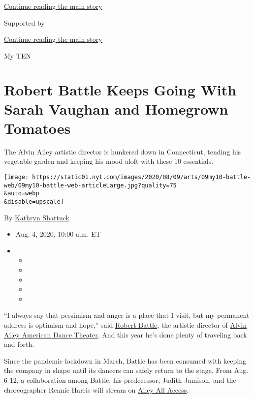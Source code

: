 \protect\hyperlink{after-top}{Continue reading the main story}

Supported by

\protect\hyperlink{after-sponsor}{Continue reading the main story}

My TEN

\hypertarget{robert-battle-keeps-going-with-sarah-vaughan-and-homegrown-tomatoes}{%
\section{Robert Battle Keeps Going With Sarah Vaughan and Homegrown
Tomatoes}\label{robert-battle-keeps-going-with-sarah-vaughan-and-homegrown-tomatoes}}

The Alvin Ailey artistic director is hunkered down in Connecticut,
tending his vegetable garden and keeping his mood aloft with these 10
essentials.

\texttt{[image: https://static01.nyt.com/images/2020/08/09/arts/09my10-battle-web/09my10-battle-web-articleLarge.jpg?quality=75\\\&auto=webp\\\&disable=upscale]}

By \href{https://www.nytimes.com/by/kathryn-shattuck}{Kathryn Shattuck}

\begin{itemize}
\item
  Aug. 4, 2020, 10:00 a.m. ET
\item
  \begin{itemize}
  \item
  \item
  \item
  \item
  \item
  \end{itemize}
\end{itemize}

``I always say that pessimism and anger is a place that I visit, but my
permanent address is optimism and hope,'' said
\href{https://www.alvinailey.org/alvin-ailey-american-dance-theater/robert-battle}{Robert
Battle}, the artistic director of
\href{https://www.alvinailey.org/}{Alvin Ailey American Dance Theater}.
And this year he's done plenty of traveling back and forth.

Since the pandemic lockdown in March, Battle has been consumed with
keeping the company in shape until its dancers can safely return to the
stage. From Aug. 6-12, a collaboration among Battle, his predecessor,
Judith Jamison, and the choreographer Rennie Harris will stream on
\href{https://www.alvinailey.org/performances-tickets/ailey-all-access}{Ailey
All Access}.

